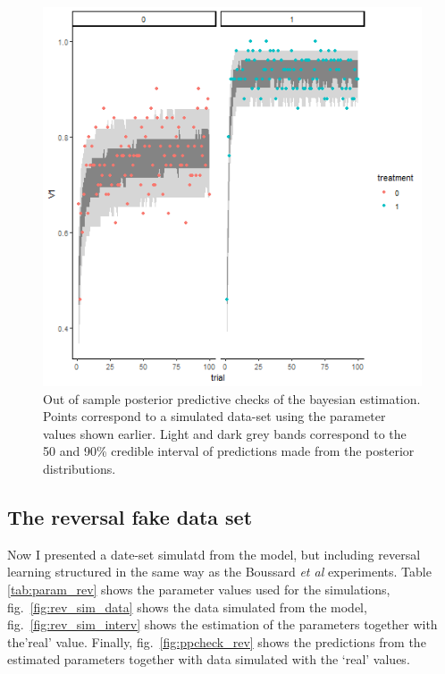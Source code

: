 \documentclass[
]{article}
\begin{document}
\begin{figure}

\includegraphics{simple_ppchecks} \hfill{}

\caption{Out of sample posterior predictive checks of the bayesian estimation. Points correspond to a simulated data-set using the parameter values shown earlier. Light and dark grey bands correspond to the 50 and 90\% credible interval of predictions made from the posterior distributions.}\label{fig:ppcheck_simple}
\end{figure}

\hypertarget{the-reversal-fake-data-set}{%
\subsection{The reversal fake data
set}\label{the-reversal-fake-data-set}}

Now I presented a date-set simulatd from the model, but including
reversal learning structured in the same way as the Boussard \emph{et
al} experiments. Table \ref{tab:param_rev} shows the parameter values
used for the simulations, fig.~\ref{fig:rev_sim_data} shows the data
simulated from the model, fig.~\ref{fig:rev_sim_interv} shows the
estimation of the parameters together with the'real' value. Finally,
fig.~\ref{fig:ppcheck_rev} shows the predictions from the estimated
parameters together with data simulated with the `real' values.
\end{document}
